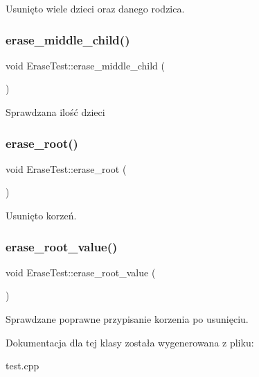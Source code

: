 Usunięto wiele dzieci oraz danego rodzica. \mbox{\label{class_erase_test_ae6bc0aa4ecaa1f2966a0e4f971d229d1}} 
\subsubsection{\texorpdfstring{erase\+\_\+middle\+\_\+child()}{erase\_middle\_child()}}
{\footnotesize\ttfamily void Erase\+Test\+::erase\+\_\+middle\+\_\+child (\begin{DoxyParamCaption}{ }\end{DoxyParamCaption})\hspace{0.3cm}{\ttfamily [inline]}}

Sprawdzana ilość dzieci \mbox{\label{class_erase_test_aa245715a2bbbcf0bd6abcca1a0992055}} 
\subsubsection{\texorpdfstring{erase\+\_\+root()}{erase\_root()}}
{\footnotesize\ttfamily void Erase\+Test\+::erase\+\_\+root (\begin{DoxyParamCaption}{ }\end{DoxyParamCaption})\hspace{0.3cm}{\ttfamily [inline]}}

Usunięto korzeń. \mbox{\label{class_erase_test_a3b1971101ff3dc813242f02a0cff68bf}} 
\subsubsection{\texorpdfstring{erase\+\_\+root\+\_\+value()}{erase\_root\_value()}}
{\footnotesize\ttfamily void Erase\+Test\+::erase\+\_\+root\+\_\+value (\begin{DoxyParamCaption}{ }\end{DoxyParamCaption})\hspace{0.3cm}{\ttfamily [inline]}}

Sprawdzane poprawne przypisanie korzenia po usunięciu. 

Dokumentacja dla tej klasy została wygenerowana z pliku\+:\begin{DoxyCompactItemize}
\item 
test.\+cpp\end{DoxyCompactItemize}
